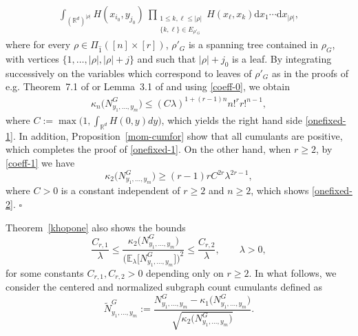 \documentclass[12pt]{article}
\newcommand{\R}{\mathbb{R}}
\newcommand{\E}{\mathbb{E}}
\def\real{{\mathord{\mathbb R}}}
\newenvironment{Proof}{\removelastskip\par\medskip
\noindent{\em Proof.} \rm}{\penalty-20\null\hfill$\square$\par\medbreak}
\numberwithin{equation}{section}
\begin{document}
\begin{Proof}
\begin{align*}
{{    }}
    \int_{(\R^d)^{|\rho|}}
     H (x_{i_0},y_{j_0})
  \ \prod_{\substack{
      1\leq k , \ell \le|\rho|
      \\
      \{ k , \ell \}\in E_{\rho'_G} }}H (x_\ell,x_k)\mathrm{d}x_1
  \cdots \mathrm{d}x_{|\rho|}, 
\end{align*}
 where for every $\rho \in \Pi_{\widehat{1}} ([n]\times[r])$,
 $\rho'_G$ is a spanning tree contained in $\rho_G$,
 with vertices $\{1,\dots,|\rho|,|\rho|+j\}$
 and such that $|\rho|+j_0$ is a leaf.
 By integrating successively on the variables which
 correspond to leaves of $\rho'_G$ as in the proofs of e.g.
 Theorem~7.1 of \cite{LNS21} or
 Lemma~3.1 of \cite{can2022} and using \eqref{coeff-0}, we obtain 
\begin{align*}
\kappa_n\big(N_{y_1,\dots,y_m}^G\big)\le (C\lambda)^{1+(r-1)n}n!^rr!^{n-1},
\end{align*}
 where $C:= \max \big( 1 , \int_{\real^d} H(0,y) dy \big)$, 
 which yields the right hand side \eqref{onefixed-1}. 
 In addition, Proposition~\ref{mom-cumfor} show
 that all cumulants are positive,
 which completes the proof of \eqref{onefixed-1}. 
 On the other hand, when $r\geq 2$, by
 \eqref{coeff-1} we have 
\begin{equation}
\nonumber
\kappa_2\big(N^G_{y_1,\ldots , y_m}\big)\geq (r-1)rC^{2r} \lambda^{2r-1},
\end{equation}
where $C>0$ is a constant independent of $r \geq 2$ and $n \geq 2$,
which shows \eqref{onefixed-2}. 
\end{Proof}
Theorem~\ref{khopone} also shows the bounds 
\begin{equation}
  \label{lb} 
\frac{C_{r,1}}{\lambda}
\leq
\frac{\kappa_2 \big(N_{y_1,\dots,y_m}^G\big)}{
    \big( \E_\lambda \big[ {N}_{y_1,\ldots , y_m}^G \big] \big)^2
    }
\leq 
\frac{C_{r,2}}{\lambda},
\qquad \lambda > 0, 
\end{equation} 
for some constants $C_{r,1},C_{r,2}>0$ depending only on $r\geq 2$. 
 In what follows, we consider the centered and normalized subgraph count cumulants defined as 
$$
 \widetilde{N}_{y_1,\ldots , y_m}^G
 := \frac{N_{y_1,\ldots , y_m}^G - \kappa_1 \big(N_{y_1,\ldots , y_m}^G \big)}{\sqrt{\kappa_2\big( N_{y_1,\ldots , y_m}^G \big)}}. 
$$
\end{document}
